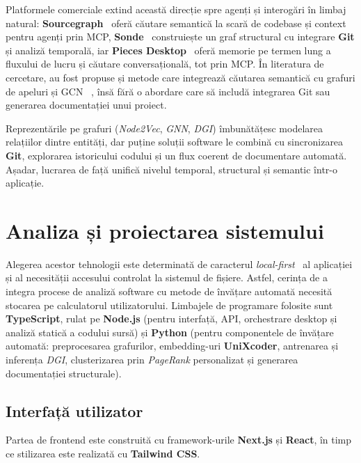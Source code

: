 \documentclass[12pt]{article}
\numberwithin{equation}{section}
\numberwithin{figure}{section}
\numberwithin{table}{section}
\theoremstyle{definition}
\theoremstyle{plain}
\begin{document}
Platformele comerciale extind această direcție spre agenți și interogări în limbaj natural: \textbf{Sourcegraph}~\cite{sourcegraph2026} oferă căutare semantică la scară de codebase și context pentru agenți prin MCP, \textbf{Sonde}~\cite{sonde2026} construiește un graf structural cu integrare \textbf{Git} și analiză temporală,  iar \textbf{Pieces Desktop}~\cite{pieces2026} oferă memorie pe termen lung a fluxului de lucru și căutare conversațională, tot prin MCP. În literatura de cercetare, au fost propuse și metode care integrează căutarea semantică cu grafuri de apeluri și GCN ~\cite{abadsieper2020semantic}, însă fără o abordare care să includă integrarea Git sau generarea documentației unui proiect.

Reprezentările pe grafuri (\textit{Node2Vec}, \textit{GNN}, \textit{DGI}) îmbunătățesc modelarea relațiilor dintre entități, dar puține soluții software le combină cu sincronizarea \textbf{Git}, explorarea istoricului codului și un flux coerent de documentare automată. Așadar, lucrarea de față unifică nivelul temporal, structural și semantic într-o aplicație.

\begingroup
\sloppy
\section{Analiza și proiectarea sistemului}

Alegerea acestor tehnologii este determinată de caracterul \textit{local-first}~\cite{kleppmann2019localfirst} al aplicației și al necesității accesului controlat la sistemul de fișiere. Astfel, cerința de a integra procese de analiză software cu metode de învățare automată necesită stocarea pe calculatorul utilizatorului. Limbajele de programare folosite sunt \textbf{TypeScript}, rulat pe \textbf{Node.js} (pentru interfață, API, orchestrare desktop și analiză statică a codului sursă) și \textbf{Python} (pentru componentele de învățare automată: preprocesarea grafurilor, embedding-uri \textbf{UniXcoder}, antrenarea și inferența \textit{DGI}, clusterizarea prin \textit{PageRank} personalizat și generarea documentației structurale).

\subsection{Interfață utilizator}

Partea de frontend este construită cu framework-urile \textbf{Next.js} și \textbf{React}, în timp ce stilizarea este realizată cu \textbf{Tailwind CSS}.
\end{document}
